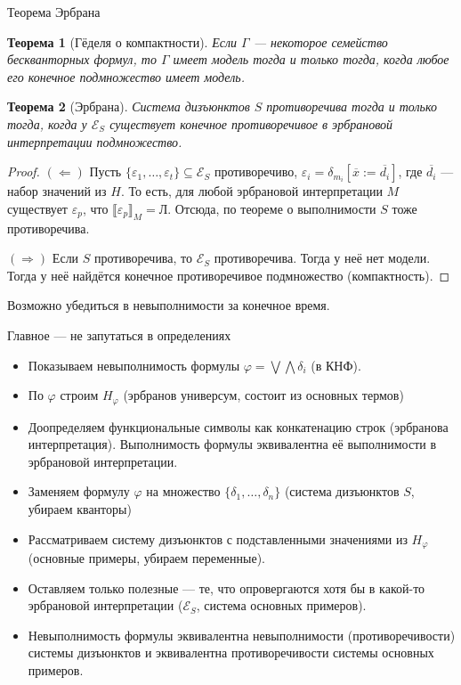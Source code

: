 \documentclass[aspectratio=169]{beamer}
\newtheorem{thm}{Теорема}[section]
\begin{document}
\begin{frame}{Теорема Эрбрана}
\begin{thm}[Гёделя о компактности]Если $\Gamma$ --- некоторое семейство бескванторных формул, то $\Gamma$ имеет модель
тогда и только тогда, когда любое его конечное подмножество имеет модель.\end{thm}

\begin{thm}[Эрбрана]Система дизъюнктов $S$ противоречива тогда и только тогда, когда у
$\mathcal{E}_S$ существует конечное противоречивое в эрбрановой интерпретации подмножество.\end{thm}
\begin{proof}$(\Leftarrow)$ 
Пусть $\{\varepsilon_1,\dots,\varepsilon_t\} \subseteq \mathcal{E}_S$ противоречиво, $\varepsilon_i = \delta_{m_i}[\overline{x} := \overline{d_i}]$,
где $\overline{d_i}$ --- набор значений из $H$. 
То есть, для любой эрбрановой интерпретации $M$ существует $\varepsilon_p$, что $\llbracket\varepsilon_p\rrbracket_M = \text{Л}$. 
Отсюда, по теореме о выполнимости $S$ тоже противоречива.

$(\Rightarrow)$ Если $S$ противоречива, то $\mathcal{E}_S$ противоречива. 
Тогда у неё нет модели. Тогда у неё найдётся конечное противоречивое подмножество (компактность).
\end{proof}

Возможно убедиться в невыполнимости за конечное время.
\end{frame}

\begin{frame}{Главное --- не запутаться в определениях}
\begin{itemize}
\item Показываем невыполнимость формулы $\varphi = \bigvee\bigwedge\delta_i$ (в КНФ).
\item По $\varphi$ строим $H_\varphi$ (эрбранов универсум, состоит из основных термов)
\item Доопределяем функциональные символы как конкатенацию строк (эрбранова интерпретация).
Выполнимость формулы эквивалентна её выполнимости в эрбрановой интерпретации.
\item Заменяем формулу $\varphi$ на множество $\{\delta_1,\dots,\delta_n\}$ (система дизъюнктов $S$, убираем кванторы)
\item Рассматриваем систему дизъюнктов с подставленными значениями из $H_\varphi$ (основные примеры, убираем переменные).
\item Оставляем только полезные --- те, что опровергаются хотя бы в какой-то эрбрановой интерпретации ($\mathcal{E}_S$, система основных примеров).
\item Невыполнимость формулы эквивалентна невыполнимости (про\-ти\-во\-ре\-чи\-вос\-ти) системы дизъюнктов и эквивалентна
противоречивости системы основных примеров.
\end{itemize}
\end{frame}
\end{document}
